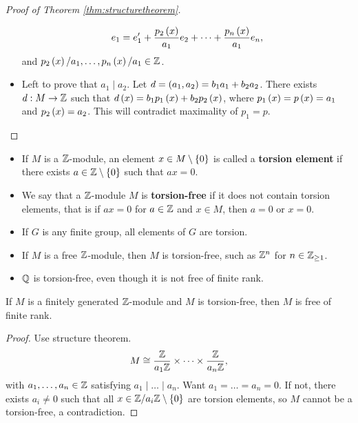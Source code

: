 \begin{proof}[Proof of Theorem \ref{thm:structuretheorem}]
\begin{itemize}
$$ e_1 = e_1' + \dfrac{p_2\left( x \right)}{a_1}e_2 + \dots + \dfrac{p_n\left( x \right)}{a_1}e_n, $$
and $ p_2\left( x \right) / a_1, \dots, p_n\left( x \right) / a_1 \in \mathbb{Z} $.
\item Left to prove that $ a_1 \mid a_2 $. Let $ d = \left( a_1, a_2 \right) = b_1a_1 + b_2a_2 $. There exists $ d : M \to \mathbb{Z} $ such that $ d\left( x \right) = b_1p_1\left( x \right) + b_2p_2\left( x \right) $, where $ p_1\left( x \right) = p\left( x \right) = a_1 $ and $ p_2\left( x \right) = a_2 $. This will contradict maximality of $ p_1 = p $.
\end{itemize}
\end{proof}


\begin{definition}
\hfill
\begin{itemize}
\item If $ M $ is a $ \mathbb{Z} $-module, an element $ x \in M \setminus \left\{ 0 \right\} $ is called a \textbf{torsion element} if there exists $ a \in \mathbb{Z} \setminus \left\{ 0 \right\} $ such that $ ax = 0 $.
\item We say that a $ \mathbb{Z} $-module $ M $ is \textbf{torsion-free} if it does not contain torsion elements, that is if $ ax = 0 $ for $ a \in \mathbb{Z} $ and $ x \in M $, then $ a = 0 $ or $ x = 0 $.
\end{itemize}
\end{definition}

\begin{example*}
\hfill
\begin{itemize}
\item If $ G $ is any finite group, all elements of $ G $ are torsion.
\item If $ M $ is a free $ \mathbb{Z} $-module, then $ M $ is torsion-free, such as $ \mathbb{Z}^n $ for $ n \in \mathbb{Z}_{\ge 1} $.
\item $ \mathbb{Q} $ is torsion-free, even though it is not free of finite rank.
\end{itemize}
\end{example*}

\begin{proposition}
If $ M $ is a finitely generated $ \mathbb{Z} $-module and $ M $ is torsion-free, then $ M $ is free of finite rank.
\end{proposition}

\begin{proof}
Use structure theorem.
$$ M \cong \dfrac{\mathbb{Z}}{a_1\mathbb{Z}} \times \dots \times \dfrac{\mathbb{Z}}{a_n\mathbb{Z}}, $$
with $ a_1, \dots, a_n \in \mathbb{Z} $ satisfying $ a_1 \mid \dots \mid a_n $. Want $ a_1 = \dots = a_n = 0 $. If not, there exists $ a_i \ne 0 $ such that all $ x \in \mathbb{Z} / a_i\mathbb{Z} \setminus \left\{ 0 \right\} $ are torsion elements, so $ M $ cannot be a torsion-free, a contradiction.
\end{proof}

